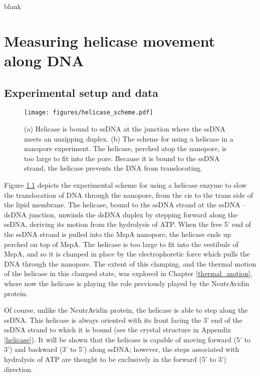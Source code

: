 \begin{savequote}[75mm]
blank
\end{savequote}

\chapter{Measuring helicase movement along DNA}
\label{helicase_on_dna}

\section{Experimental setup and data}

\begin{figure}[h]
\begin{centering}
\texttt{[image: figures/helicase\_scheme.pdf]}
\caption[Helicase can control DNA translocation]{(a) Helicase is bound to ssDNA at the junction where the ssDNA meets an unzipping duplex.  (b) The scheme for using a helicase in a nanopore experiment.  The helicase, perched atop the nanopore, is too large to fit into the pore.  Because it is bound to the ssDNA strand, the helicase prevents the DNA from translocating.}
\label{fig:helicase_scheme}
\end{centering}
\end{figure}

Figure \ref{fig:helicase_scheme} depicts the experimental scheme for using a helicase enzyme to slow the translocation of DNA through the nanopore, from the cis to the trans side of the lipid membrane.  The helicase, bound to the ssDNA strand at the ssDNA – dsDNA junction, unwinds the dsDNA duplex by stepping forward along the ssDNA, deriving its motion from the hydrolysis of ATP.  When the free 5’ end of the ssDNA strand is pulled into the MspA nanopore, the helicase ends up perched on top of MspA.  The helicase is too large to fit into the vestibule of MspA, and so it is clamped in place by the electrophoretic force which pulls the DNA through the nanopore.  The extent of this clamping, and the thermal motion of the helicase in this clamped state, was explored in Chapter \ref{thermal_motion}, where now the helicase is playing the role previously played by the NeutrAvidin protein.

Of course, unlike the NeutrAvidin protein, the helicase is able to step along the ssDNA.  This helicase is always oriented with its front facing the 3’ end of the ssDNA strand to which it is bound (see the crystal structure in Appendix \ref{helicase}).  It will be shown that the helicase is capable of moving forward (5’ to 3’) and backward (3’ to 5’) along ssDNA; however, the steps associated with hydrolysis of ATP are thought to be exclusively in the forward (5’ to 3’) direction.

